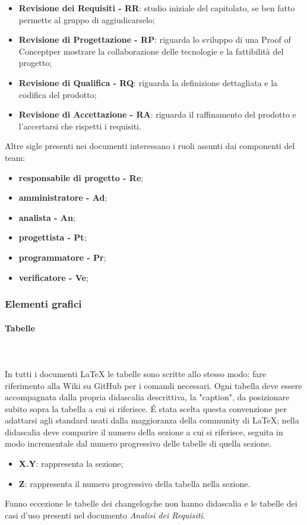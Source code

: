 		\begin{itemize}
			\item \textbf{Revisione dei Requisiti - RR}: studio iniziale del capitolato\glo, se ben fatto permette al gruppo di aggiudicarselo;
			\item \textbf{Revisione di Progettazione - RP}: riguarda lo sviluppo di una Proof of Concept\glosp per mostrare la collaborazione delle tecnologie e la fattibilità del progetto;
			\item \textbf{Revisione di Qualifica - RQ}: riguarda la definizione dettagliata e la codifica del prodotto;
			\item \textbf{Revisione di Accettazione - RA}: riguarda il raffinamento del prodotto e l'accertarsi che rispetti i requisiti.	
		\end{itemize}	
		Altre sigle presenti nei documenti interessano i ruoli assunti dai componenti del team:
		\begin{itemize}
			\item \textbf{responsabile di progetto - Re};
			\item \textbf{amministratore - Ad};
			\item \textbf{analista - An};
			\item \textbf{progettista - Pt};
			\item \textbf{programmatore - Pr};
			\item \textbf{verificatore - Ve};
		\end{itemize}
		\subsubsection{Elementi grafici}
		\paragraph{Tabelle} \mbox{}\\ \mbox{}\\
		In tutti i documenti \LaTeX{} le tabelle sono scritte allo stesso modo: fare riferimento alla Wiki su GitHub per i comandi necessari.\newline 
		Ogni tabella deve essere accompagnata dalla propria didascalia descrittiva, la "caption", da posizionare subito sopra la tabella a cui si riferisce. \'E stata scelta questa convenzione per adattarsi agli standard usati dalla maggioranza della community di \LaTeX{}; nella didascalia deve comparire il numero della sezione a cui si riferisce, seguita in modo incrementale dal numero progressivo delle tabelle di quella sezione.
		\begin{itemize}
			\item \textbf{{X.Y}}: rappresenta la sezione;
			\item \textbf{{Z}}: rappresenta il numero progressivo della tabella nella sezione.
		\end{itemize}
		Fanno eccezione le tabelle dei changelog\glosp che non hanno didascalia e le tabelle dei casi d'uso presenti nel documento \textit{Analisi dei Requisiti}.
